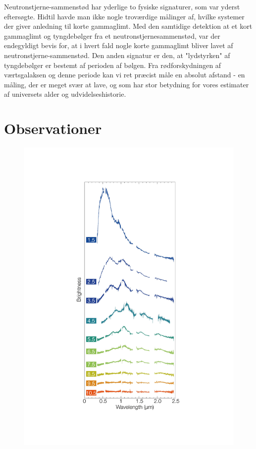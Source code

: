 \documentclass[twocolumn]{article}
\begin{document}
Neutronstjerne-sammenstød har yderlige to fysiske signaturer, som var yderst eftersøgte. Hidtil havde man ikke nogle troværdige målinger af, hvilke systemer der giver anledning til korte gammaglimt. Med den samtidige detektion at et kort gammaglimt og tyngdebølger fra et neutronstjernesammenstød, var der endegyldigt bevis for, at i hvert fald nogle korte gammaglimt bliver lavet af neutronstjerne-sammenstød. Den anden signatur er den, at "lydstyrken" af tyngdebølger er bestemt af perioden af bølgen. Fra rødforskydningen af værtsgalaksen og denne periode kan vi ret præcist måle en absolut afstand - en måling, der er meget svær at lave, og som har stor betydning for vores estimater af universets alder og udvidelseshistorie. 


\section{Observationer}\label{obs}

\begin{figure}
\includegraphics[width=\columnwidth]{specs.pdf}
\end{figure}
\end{document}
